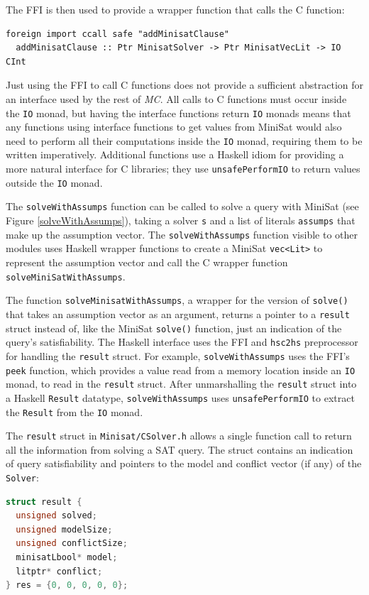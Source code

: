 \documentclass[12pt,a4paper,twoside,openright]{report}
\begin{document}
{{The FFI is then used to provide a wrapper function that calls
the C function:
\begin{lstlisting}
foreign import ccall safe "addMinisatClause"
  addMinisatClause :: Ptr MinisatSolver -> Ptr MinisatVecLit -> IO CInt
\end{lstlisting}

Just using the FFI to call C functions does not provide a
sufficient abstraction for an interface used by the rest of \emph{MC}. All
calls to C functions must occur inside the \verb,IO, monad, but having
the interface functions return \verb,IO, monads means that any functions
using interface functions to get values from MiniSat would also need to
perform all their computations inside the \verb,IO, monad, requiring them to
be written imperatively.
Additional functions use a Haskell idiom for providing a more natural
interface for C libraries; they use \verb,unsafePerformIO, to return
values outside the \verb,IO, monad.

The \verb,solveWithAssumps, function can be called to
solve a query with MiniSat (see Figure \ref{solveWithAssumps}),
taking a solver \verb,s, and a list of literals \verb,assumps,
that make up the assumption vector. The \verb,solveWithAssumps, function
visible to other modules uses Haskell wrapper functions to create
a MiniSat \verb,vec<Lit>, to represent the assumption vector and call
the C wrapper function \verb,solveMiniSatWithAssumps,.

The function \verb,solveMinisatWithAssumps,, a wrapper for the version of \verb,solve(),
that takes an assumption vector as an argument, returns a pointer to a
\verb,result, struct instead of, like the MiniSat \verb,solve(), function,
just an indication of the query's satisfiability.
The Haskell interface uses the FFI and \verb,hsc2hs, preprocessor
for handling the \verb,result, struct. For example, \verb,solveWithAssumps,
uses the FFI's \verb,peek, function,
which provides a value read from a memory location inside
an \verb,IO, monad, to read in the \verb,result, struct. After unmarshalling
the \verb,result, struct into a Haskell \verb,Result, datatype, \verb,solveWithAssumps,
uses \verb,unsafePerformIO, to extract the \verb,Result, from the \verb,IO, monad.

The \verb,result, struct in \verb,Minisat/CSolver.h,
allows a single function call to return
all the information from solving a SAT query. The struct contains an indication of query satisfiability
and pointers to the model and conflict vector (if any) of the \verb,Solver,:
\begin{lstlisting}[language=C]
struct result {
  unsigned solved;
  unsigned modelSize;
  unsigned conflictSize;
  minisatLbool* model;
  litptr* conflict;
} res = {0, 0, 0, 0, 0};
\end{lstlisting}

}}
\end{document}
